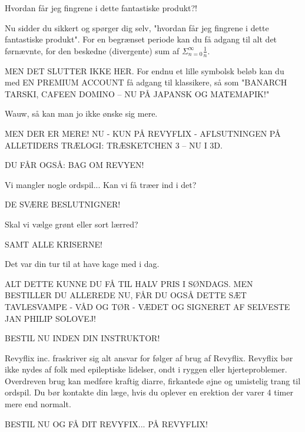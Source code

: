 \documentclass[a4paper,11pt]{article}
\begin{document}
\begin{sketch}
 Hvordan får jeg fingrene i dette fantastiske produkt?!

 Nu sidder du sikkert og spørger dig selv, "hvordan får jeg fingrene i
dette fantastiske produkt". For en begrænset periode kan du få adgang til alt
det førnævnte, for den beskedne (divergente) sum af $\Sigma_{n=0}^{\infty}
\frac{1}{n}$.


 MEN DET SLUTTER IKKE HER. For endnu et lille symbolsk beløb kan du med EN PREMIUM ACCOUNT få adgang til klassikere, så som "BANARCH TARSKI, CAFEEN DOMINO – NU PÅ JAPANSK OG MATEMAPIK!"

 Wauw, så kan man jo ikke ønske sig mere.

 MEN DER ER MERE! NU - KUN PÅ REVYFLIX - AFLSUTNINGEN PÅ
ALLETIDERS TRÆLOGI: TRÆSKETCHEN 3 – NU I 3D.

 DU FÅR OGSÅ: BAG OM REVYEN!

 Vi mangler nogle ordspil... Kan vi få træer ind i det?

 DE SVÆRE BESLUTNIGNER!

 Skal vi vælge grønt eller sort lærred?

 SAMT ALLE KRISERNE!

 Det var din tur til at have kage med i dag.

 ALT DETTE KUNNE DU FÅ TIL HALV PRIS I SØNDAGS. MEN BESTILLER DU
ALLEREDE NU, FÅR DU OGSÅ DETTE SÆT TAVLESVAMPE - VÅD OG TØR - VÆDET OG SIGNERET AF SELVESTE JAN PHILIP SOLOVEJ!


 BESTIL NU INDEN DIN INSTRUKTOR!



 Revyflix inc. fraskriver sig alt ansvar for følger af brug af Revyflix. Revyflix bør ikke nydes af folk med epileptiske lidelser, ondt i ryggen eller hjerteproblemer. Overdreven brug kan medføre kraftig diarre, firkantede øjne og umistelig trang til ordspil. Du bør kontakte din læge, hvis du oplever en erektion der varer 4 timer mere end normalt.

 BESTIL NU OG FÅ DIT REVYFIX... PÅ REVYFLIX!
\end{sketch}
\end{document}
